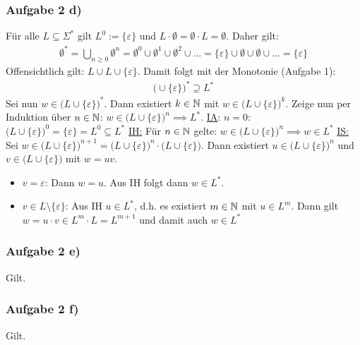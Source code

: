 \subsubsection{Aufgabe 2 d)}
Für alle $L\subseteq\Sigma^\ast$ gilt $L^0:=\lbrace\varepsilon\rbrace$ und $L\cdot\emptyset=\emptyset\cdot L=\emptyset$. Daher gilt:
\begin{align*}
	\emptyset^\ast=\bigcup\limits_{n\geq0}\emptyset^n=\emptyset^0\cup\emptyset^1\cup\emptyset^2\cup\ldots=\lbrace\varepsilon\rbrace\cup\emptyset\cup\emptyset\cup\ldots=\lbrace\varepsilon\rbrace
\end{align*}
Offensichtlich gilt: $L\cup L\cup\lbrace\varepsilon\rbrace$. 
Damit folgt mit der Monotonie (Aufgabe 1):
\begin{align*}
	\big(\cup\lbrace\varepsilon\rbrace\big)^\ast\supseteq L^\ast
\end{align*}
Sei nun $w\in \big(L\cup\lbrace\varepsilon\rbrace\big)^\ast$. 
Dann existiert $k\in\mathbb{N}$ mit $w\in\big(L\cup\lbrace\varepsilon\rbrace\big)^k$. 
Zeige nun per Induktion über $n\in\mathbb{N}$: $w\in\big(L\cup\lbrace\varepsilon\rbrace\big)^n\implies L^\ast$.\nl
\ul{IA}: $n=0$: $\big(L\cup\lbrace\varepsilon\rbrace\big)^0=\lbrace\varepsilon\rbrace=L^0\subseteq L^\ast$\nl
\ul{IH:} Für $n\in\mathbb{N}$ gelte: $w\in\big(L\cup\lbrace\varepsilon\rbrace\big)^n\implies w\in L^\ast$\nl
\ul{IS:} Sei $w\in\big(L\cup\lbrace\varepsilon\rbrace\big)^{n+1}=\big(L\cup\lbrace\varepsilon\rbrace\big)^n\cdot\big(L\cup\lbrace\varepsilon\rbrace\big)$. Dann existiert $u\in\big(L\cup\lbrace\varepsilon\rbrace\big)^n$ und $v\in\big(L\cup\lbrace\varepsilon\rbrace\big)$ mit $w=uv$.

\begin{itemize}
	\item $v=\varepsilon$: Dann $w=u$. Aus IH folgt dann $w\in L^\ast$.
	\item $v\in L\setminus\lbrace\varepsilon\rbrace$: Aus IH $u\in L^\ast$, d.h. es existiert $m\in\mathbb{N}$ mit $u\in L^m$. 
	Dann gilt $w=u\cdot v\in L^m\cdot L=L^{m+1}$ und damit auch $w\in L^\ast$
\end{itemize}

\subsubsection{Aufgabe 2 e)}
Gilt.

\subsubsection{Aufgabe 2 f)}
Gilt.

